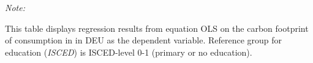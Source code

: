 \begin{table}[htbp!]
\begin{adjustbox}{width = 1\textwidth, max height = 0.95\textheight, center}
\begin{threeparttable}[b]
         \begin{tablenotes}\item \medskip \textit{Note:}
            \item This table displays regression results from equation OLS on the carbon footprint of consumption in  in DEU as the dependent variable.  Reference group for education (\textit{ISCED}) is ISCED-level 0-1 (primary or no education).
         \end{tablenotes}
      \end{threeparttable}
   \end{adjustbox}
\end{table}


